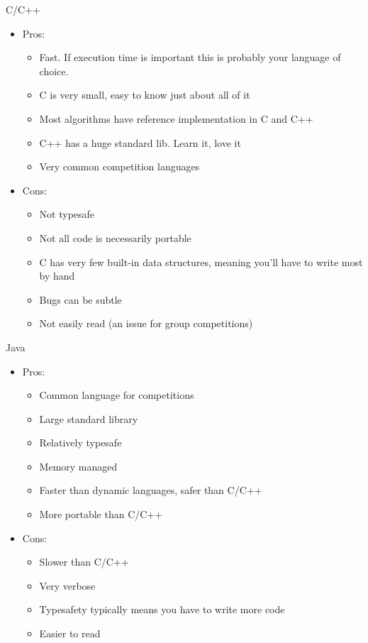 \documentclass{beamer}
\begin{document}
\begin{frame}{C/C++}
  \begin{centering}
    \begin{itemize}
      \item Pros:
      \begin{itemize}
        \item Fast. If execution time is important this is probably your language of choice.
        \item C is very small, easy to know just about all of it
        \item Most algorithms have reference implementation in C and C++
        \item C++ has a huge standard lib. Learn it, love it
        \item Very common competition languages
      \end{itemize}
      \item Cons:
      \begin{itemize}
        \item Not typesafe
        \item Not all code is necessarily portable
        \item C has very few built-in data structures, meaning you'll have to write most by hand
        \item Bugs can be subtle
        \item Not easily read (an issue for group competitions)
      \end{itemize}
    \end{itemize}
  \end{centering}
\end{frame}



\begin{frame}{Java}
  \begin{centering}
    \begin{itemize}
      \item Pros:
      \begin{itemize}
        \item Common language for competitions
        \item Large standard library
        \item Relatively typesafe
        \item Memory managed
        \item Faster than dynamic languages, safer than C/C++
        \item More portable than C/C++
      \end{itemize}
      \item Cons:
      \begin{itemize}
        \item Slower than C/C++
        \item Very verbose
        \item Typesafety typically means you have to write more code
        \item Easier to read
      \end{itemize}
    \end{itemize}
  \end{centering}
\end{frame}
\end{document}
